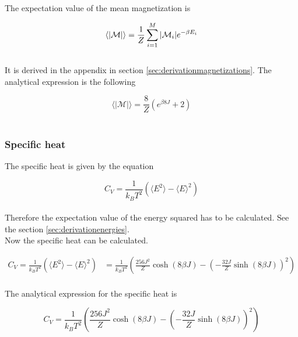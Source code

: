 \documentclass{article}
\begin{document}
The expectation value of the mean magnetization is

\begin{equation}    \label{eq:meanmagnetization}
    \langle |\mathcal{M}| \rangle = \frac{1}{Z} \sum _{i=1} ^M |\mathcal{M}_i| e^{- \beta E_i} \\
\end{equation} \\

It is derived in the appendix in section \ref{sec:derivationmagnetizations}. The analytical expression is the following

\begin{equation} \label{eq:finalmeanmagnetization}
    \langle | \mathcal{M} | \rangle = \frac{8}{Z} \left( e^{\beta 8J} + 2 \right)
\end{equation} \\


\subsubsection{Specific heat} \label{sec:specificheat}

The specific heat is given by the equation

\begin{equation}    \label{eq:specificheat}
    C_V = \frac{1}{k_B T^2} \left( \langle E^2 \rangle - \langle E \rangle ^2 \right)
\end{equation} \\

Therefore the expectation value of the energy squared has to be calculated. See the section \ref{sec:derivationenergies}. \\

Now the specific heat can be calculated.

\begin{align*}
    C_V = \frac{1}{k_B T^2} \left( \langle E^2 \rangle - \langle E \rangle ^2 \right)
    &= \frac{1}{k_B T^2} \left( \frac{256 J^2}{Z} \cosh (8 \beta J) - \left( - \frac{32 J}{Z} \sinh(8 \beta J ) \right) ^2 \right)
\end{align*} \\

The analytical expression for the specific heat is

\begin{equation} \label{eq:finalspecificheat}
    C_V = \frac{1}{k_B T^2} \left( \frac{256 J^2}{Z} \cosh (8 \beta J) - \left( - \frac{32 J}{Z} \sinh(8 \beta J ) \right) ^2 \right)
\end{equation} \\
\end{document}
